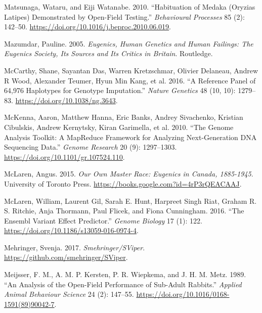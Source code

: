 \documentclass[
]{book}
\newlength{\cslhangindent}
\newlength{\cslentryspacingunit} %
\newenvironment{CSLReferences}[2] %
 {%
  \setlength{\parindent}{0pt}
  \ifodd #1
  \let\oldpar\par
  \def\par{\hangindent=\cslhangindent\oldpar}
  \fi
  \setlength{\parskip}{#2\cslentryspacingunit}
 }%
 {}
\begin{document}
\begin{CSLReferences}{1}{0}
\leavevmode{}%
Matsunaga, Wataru, and Eiji Watanabe. 2010. {``Habituation of Medaka ({Oryzias} Latipes) Demonstrated by Open-Field Testing.''} \emph{Behavioural Processes} 85 (2): 142--50. \url{https://doi.org/10.1016/j.beproc.2010.06.019}.

\leavevmode{}%
Mazumdar, Pauline. 2005. \emph{Eugenics, Human Genetics and Human Failings: The {Eugenics Society}, Its Sources and Its Critics in {Britain}}. {Routledge}.

\leavevmode{}%
McCarthy, Shane, Sayantan Das, Warren Kretzschmar, Olivier Delaneau, Andrew R Wood, Alexander Teumer, Hyun Min Kang, et al. 2016. {``A Reference Panel of 64,976 Haplotypes for Genotype Imputation.''} \emph{Nature Genetics} 48 (10, 10): 1279--83. \url{https://doi.org/10.1038/ng.3643}.

\leavevmode{}%
McKenna, Aaron, Matthew Hanna, Eric Banks, Andrey Sivachenko, Kristian Cibulskis, Andrew Kernytsky, Kiran Garimella, et al. 2010. {``The {Genome Analysis Toolkit}: {A MapReduce} Framework for Analyzing Next-Generation {DNA} Sequencing Data.''} \emph{Genome Research} 20 (9): 1297--1303. \url{https://doi.org/10.1101/gr.107524.110}.

\leavevmode{}%
McLaren, Angus. 2015. \emph{Our {Own Master Race}: {Eugenics} in {Canada}, 1885-1945}. {University of Toronto Press}. \url{https://books.google.com?id=4rP3rQEACAAJ}.

\leavevmode{}%
McLaren, William, Laurent Gil, Sarah E. Hunt, Harpreet Singh Riat, Graham R. S. Ritchie, Anja Thormann, Paul Flicek, and Fiona Cunningham. 2016. {``The {Ensembl Variant Effect Predictor}.''} \emph{Genome Biology} 17 (1): 122. \url{https://doi.org/10.1186/s13059-016-0974-4}.

\leavevmode{}%
Mehringer, Svenja. 2017. \emph{Smehringer/{SViper}}. \url{https://github.com/smehringer/SViper}.

\leavevmode{}%
Meijsser, F. M., A. M. P. Kersten, P. R. Wiepkema, and J. H. M. Metz. 1989. {``An Analysis of the Open-Field Performance of Sub-Adult Rabbits.''} \emph{Applied Animal Behaviour Science} 24 (2): 147--55. \url{https://doi.org/10.1016/0168-1591(89)90042-7}.


\end{CSLReferences}
\end{document}
